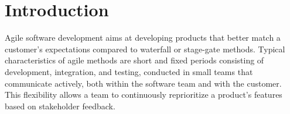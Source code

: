 \documentclass[10pt,a4paper]{IEEEtran} %
\begin{document}
\begin{comment}

\begin{itemize}
\item Structure similar to the XP paper
\item Have a related work section to extract a few key points from the relevant work to connect to
\item Link to mapping study on scaling paper: \url{http://www.sciencedirect.com/science/article/pii/S0164121216300826}
\item Link to \url{http://www.sciencedirect.com/science/article/pii/S016412121600087X}
\item Link to \url{http://arxiv.org/abs/1402.5557}
\item Link to \url{http://ieeexplore.ieee.org/xpls/abs_all.jsp?arnumber=7302487&tag=1}
\item Link to \url{https://disciplinedagileconsortium.org/Resources/Documents/ScalingagileSoftwareDevelopment.pdf}
\item \url{http://link.springer.com/chapter/10.1007/978-3-319-14358-3_1}
\item Avoid characteristic of being a replication study but point out strengths
\item How should we present the list of items? We should link the DO's and DONT's to the identify matching topics
\item Base the connection on the XP paper methodology
\item We should strengthen the ``mechatronics'' angle in our paper
\end{itemize}

\end{comment}




\section{Introduction} %
\label{sec:intro}


Agile software development aims at developing products that better match a
customer's expectations compared to waterfall or stage-gate methods. Typical
characteristics of agile methods are short and fixed periods consisting of
development, integration, and testing, conducted in small teams that communicate actively, both within the software team and with the customer. This flexibility allows a team to continuously reprioritize a product's features based on stakeholder feedback. 
\end{document}
